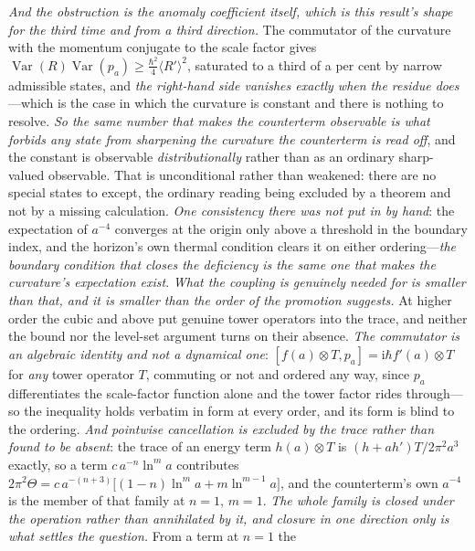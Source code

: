 \documentclass[11pt,a4paper]{article}
\theoremstyle{plain}
\theoremstyle{definition}
\theoremstyle{remark}
\begin{document}
\emph{And the obstruction is the anomaly coefficient itself, which is this result's shape for the third
time and from a third direction.} The commutator of the curvature with the momentum conjugate to the
scale factor gives $\operatorname{Var}(R)\operatorname{Var}(p_a)\ge\tfrac{\hbar^{2}}{4}\langle
R'\rangle^{2}$, saturated to a third of a per cent by narrow admissible states, and \emph{the
right-hand side vanishes exactly when the residue does}---which is the case in which the curvature is
constant and there is nothing to resolve. \emph{So the same number that makes the counterterm observable
is what forbids any state from sharpening the curvature the counterterm is read off}, and the constant
is observable \emph{distributionally} rather than as an ordinary sharp-valued observable. That is
unconditional rather than weakened: there are no special states to except, the ordinary reading being
excluded by a theorem and not by a missing calculation. \emph{One consistency there was not put in by
hand}: the expectation of $a^{-4}$ converges at the origin only above a threshold in the boundary
index, and the horizon's own thermal condition clears it on either ordering---\emph{the boundary
condition that closes the deficiency is the same one that makes the curvature's expectation
exist}.
\emph{What the coupling is genuinely needed for is smaller than that, and it is smaller than the order of
the promotion suggests.} At higher order the cubic and above put genuine tower operators into the trace,
and neither the bound nor the level-set argument turns on their absence. \emph{The commutator is an
algebraic identity and not a dynamical one}: $[f(a)\otimes T,p_a]=\mathrm{i}\hbar f'(a)\otimes T$ for
\emph{any} tower operator $T$, commuting or not and ordered any way, since $p_a$ differentiates the
scale-factor function alone and the tower factor rides through---so the inequality holds verbatim in form
at every order, and its form is blind to the ordering. \emph{And pointwise cancellation is excluded by the
trace rather than found to be absent}: the trace of an energy term $h(a)\otimes T$ is $(h+ah')T/2\pi^{2}a^{3}$
exactly, so a term $c\,a^{-n}\ln^{m}a$ contributes
$2\pi^{2}\Theta=c\,a^{-(n+3)}\bigl[(1-n)\ln^{m}a+m\ln^{m-1}a\bigr]$, and the counterterm's own $a^{-4}$ is the
member of that family at $n=1$, $m=1$. \emph{The whole family is closed under the operation rather than
annihilated by it, and closure in one direction only is what settles the question.} From a term at $n=1$ the
\end{document}
